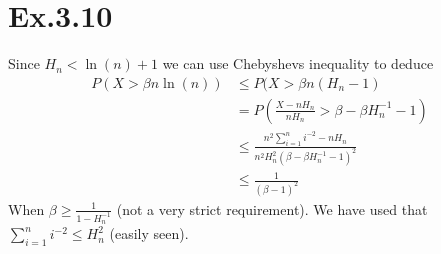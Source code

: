 \section*{Ex.3.10}
Since $H_n < \ln(n) + 1$ we can use Chebyshevs inequality to deduce
\begin{align*}
P(X > \beta n \ln(n)) &\leq P(X > \beta n (H_n - 1)
\\ &= P(\frac{X - nH_n}{nH_n} > \beta - \beta H_n^{-1} - 1)
\\ &\leq \frac{n^2 \sum_{i=1}^n i^{-2} - nH_n}{n^2 H_n^2 (\beta - \beta H_n^{-1} -1)^2}
\\ &\leq \frac{1}{(\beta - 1)^2}
\end{align*}
When $\beta \geq \frac{1}{1 - H_n^{-1}}$ (not a very strict requirement). We have used that $\sum_{i=1}^n i^{-2} \leq H_n^2$ (easily seen). 
